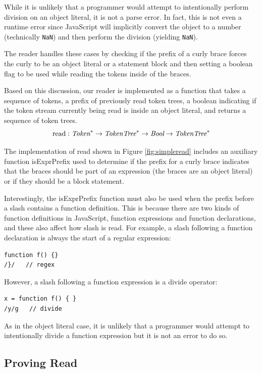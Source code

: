 \documentclass[9pt]{sigplanconf}
\begin{document}
While it is unlikely that a programmer would attempt to intentionally
perform division on an object literal, it is not a parse error. In
fact, this is not even a runtime error since JavaScript will
implicitly convert the object to a number (technically
\verb!NaN!) and then perform the division (yielding
\verb!NaN!).

The reader handles these cases by checking if the prefix of a curly
brace forces the curly to be an object literal or a statement
block and then setting a boolean flag to be used while reading the
tokens inside of the braces.

Based on this discussion, our reader is implemented as
a function that takes a sequence of tokens, a prefix of previously read token trees, a boolean indicating if the token stream currently being read is inside an object literal, and returns a sequence of token trees.
\[
\textrm{read} : \textit{Token}^{*} \rightarrow \textit{TokenTree}^{*} 
\rightarrow \textit{Bool} \rightarrow \textit{TokenTree}^{*}
\]

The implementation of read shown in Figure \ref{fig:simpleread} includes an auxiliary function isExprPrefix used to determine if the prefix for a curly brace indicates that the braces should be part of an expression (\ie the braces are an object literal) or if they should be a block statement.

Interestingly, the isExprPrefix function must also be used when the prefix before a slash contains a function definition. This is because there are two kinds of function definitions in JavaScript, function expressions and function declarations, and these also affect how slash is read. For example, a slash following a function declaration is always the start of a regular expression:
\begin{lstlisting}
function f() {}
/}/   // regex
\end{lstlisting}
However, a slash following a function expression is a divide operator:
\begin{lstlisting}
x = function f() { } 
/y/g   // divide
\end{lstlisting}
As in the object literal case, it is unlikely that a programmer would attempt to intentionally divide a function expression but it is not an error to do so.



\subsection{Proving Read}
\label{sec:provingread}
\end{document}
